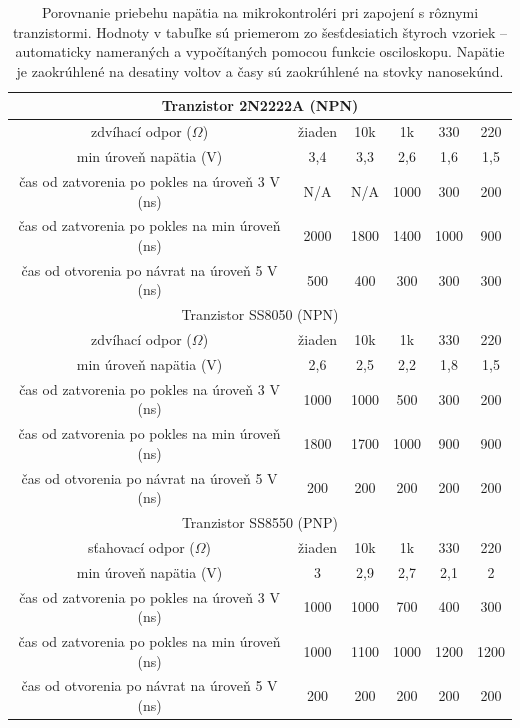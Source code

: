 \begin{table}
    \caption[Porovnanie priebehu napätia pri zapojení s rôznymi tranzistormi]{Porovnanie priebehu napätia na mikrokontroléri pri zapojení s rôznymi tranzistormi. Hodnoty v tabuľke sú priemerom zo šesťdesiatich štyroch vzoriek -- automaticky nameraných a vypočítaných pomocou funkcie osciloskopu. Napätie je zaokrúhlené na desatiny voltov a časy sú zaokrúhlené na stovky nanosekúnd.}
    \label{tab:oscVoltage}
    \begin{center}
    \begin{tabular}{|c|c|c|c|c|c|}
        \hline
        \multicolumn{6}{|c|}{Tranzistor 2N2222A (NPN)} \\
        \hline 
        zdvíhací odpor ($\Omega$) & žiaden & 10k & 1k & 330 & 220 \\
        \hline
        min úroveň napätia (V) & 3,4 & 3,3 & 2,6 & 1,6 & 1,5 \\
        \hline
        čas od zatvorenia po pokles na úroveň 3 V (ns) & N/A & N/A & 1000 & 300 & 200 \\
        \hline
        čas od zatvorenia po pokles na min úroveň (ns) & 2000 & 1800 & 1400 & 1000 & 900 \\
        \hline
        čas od otvorenia po návrat na úroveň 5 V (ns) & 500 & 400 & 300 & 300 & 300 \\
        \hline
        \multicolumn{6}{|c|}{Tranzistor SS8050 (NPN)} \\
        \hline 
        zdvíhací odpor ($\Omega$) & žiaden & 10k & 1k & 330 & 220 \\
        \hline
        min úroveň napätia (V) & 2,6 & 2,5 & 2,2 & 1,8 & 1,5 \\
        \hline
        čas od zatvorenia po pokles na úroveň 3 V (ns) & 1000 & 1000 & 500 & 300 & 200 \\
        \hline
        čas od zatvorenia po pokles na min úroveň (ns) & 1800 & 1700 & 1000 & 900 & 900 \\
        \hline
        čas od otvorenia po návrat na úroveň 5 V (ns) & 200 & 200 & 200 & 200 & 200 \\
        \hline
        \multicolumn{6}{|c|}{Tranzistor SS8550 (PNP)} \\
        \hline 
        sťahovací odpor ($\Omega$) & žiaden & 10k & 1k & 330 & 220 \\
        \hline
        min úroveň napätia (V) & 3 & 2,9 & 2,7 & 2,1 & 2 \\
        \hline
        čas od zatvorenia po pokles na úroveň 3 V (ns) & 1000 & 1000 & 700 & 400 & 300 \\
        \hline
        čas od zatvorenia po pokles na min úroveň (ns) & 1000 & 1100 & 1000 & 1200 & 1200 \\
        \hline
        čas od otvorenia po návrat na úroveň 5 V (ns) & 200 & 200 & 200 & 200 & 200 \\
        \hline
    \end{tabular}
    \end{center}
\end{table}

